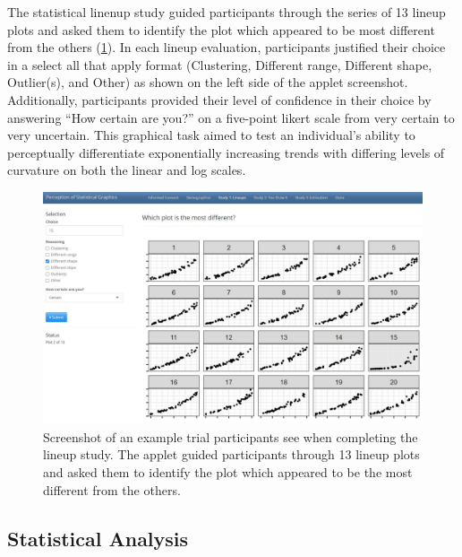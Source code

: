 \documentclass[12pt]{article}
\begin{document}
The statistical linenup study guided participants through the series of
13 lineup plots and asked them to identify the plot which appeared to be
most different from the others (\cref{fig:lineup-study-example-trial}).
In each lineup evaluation, participants justified their choice in a
select all that apply format (Clustering, Different range, Different
shape, Outlier(s), and Other) as shown on the left side of the applet
screenshot. Additionally, participants provided their level of
confidence in their choice by answering ``How certain are you?'' on a
five-point likert scale from very certain to very uncertain. This
graphical task aimed to test an individual's ability to perceptually
differentiate exponentially increasing trends with differing levels of
curvature on both the linear and log scales.

\begin{figure}[tbp]

{\centering \includegraphics[width=1\linewidth,]{images/lineup-study-example-trial} 

}

\caption{Screenshot of an example trial participants see when completing the lineup study. The applet guided participants through 13 lineup plots and asked them to identify the plot which appeared to be the most different from the others.}\label{fig:lineup-study-example-trial}
\end{figure}

\hypertarget{statistical-analysis}{%
\subsection{Statistical Analysis}\label{statistical-analysis}}
\end{document}
